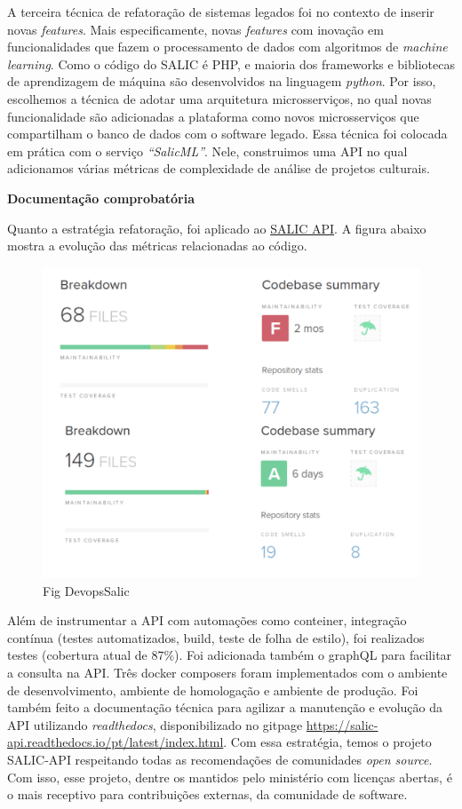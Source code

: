 A terceira técnica de refatoração de sistemas legados foi no contexto de
inserir novas \emph{features}. Mais especificamente, novas
\emph{features} com inovação em funcionalidades que fazem o
processamento de dados com algoritmos de \emph{machine learning}. Como o
código do SALIC é PHP, e maioria dos frameworks e bibliotecas de
aprendizagem de máquina são desenvolvidos na linguagem \emph{python}.
Por isso, escolhemos a técnica de adotar uma arquitetura microsserviços,
no qual novas funcionalidade são adicionadas a plataforma como novos
microsserviços que compartilham o banco de dados com o software legado.
Essa técnica foi colocada em prática com o serviço \emph{``SalicML''}.
Nele, construimos uma API no qual adicionamos várias métricas de
complexidade de análise de projetos culturais.

\textbf{Documentação comprobatória}

Quanto a estratégia refatoração, foi aplicado ao
\href{https://github.com/lappis-unb/salic-api}{SALIC API}. A figura
abaixo mostra a evolução das métricas relacionadas ao código.

\begin{figure}
\centering
\includegraphics{figs/SALICAPI.png}
\caption{Fig DevopsSalic}
\end{figure}

Além de instrumentar a API com automações como conteiner, integração
contínua (testes automatizados, build, teste de folha de estilo), foi
realizados testes (cobertura atual de 87\%). Foi adicionada também o
graphQL para facilitar a consulta na API. Três docker composers foram
implementados com o ambiente de desenvolvimento, ambiente de homologação
e ambiente de produção. Foi também feito a documentação técnica para
agilizar a manutenção e evolução da API utilizando \emph{readthedocs},
disponibilizado no gitpage
\url{https://salic-api.readthedocs.io/pt/latest/index.html}. Com essa
estratégia, temos o projeto SALIC-API respeitando todas as recomendações
de comunidades \emph{open source}. Com isso, esse projeto, dentre os
mantidos pelo ministério com licenças abertas, é o mais receptivo para
contribuições externas, da comunidade de software.

